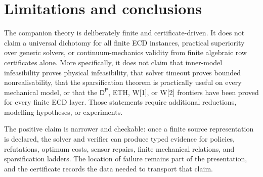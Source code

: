 \documentclass[11pt]{article}
\theoremstyle{plain}
\theoremstyle{definition}
\theoremstyle{remark}
\begin{document}
\section{Limitations and conclusions}
\label{sec:limitations}

The companion theory is deliberately finite and certificate-driven.  It does not
claim a universal dichotomy for all finite ECD instances, practical superiority
over generic solvers, or continuum-mechanics validity from finite algebraic row
certificates alone.  More specifically, it does not claim that inner-model
infeasibility proves physical infeasibility, that solver timeout proves bounded
nonrealisability, that the sparsification theorem is practically useful on every
mechanical model, or that the \(\mathsf D^{\mathsf P}\), ETH, W[1], or W[2]
frontiers have been proved for every finite ECD layer.  Those statements require
additional reductions, modelling hypotheses, or experiments.

The positive claim is narrower and checkable: once a finite source
representation is declared, the solver and verifier can produce typed evidence
for policies, refutations, optimum costs, sensor repairs, finite mechanical
relations, and sparsification ladders.  The location of failure remains part of
the presentation, and the certificate records the data needed to transport that
claim.


\end{document}

